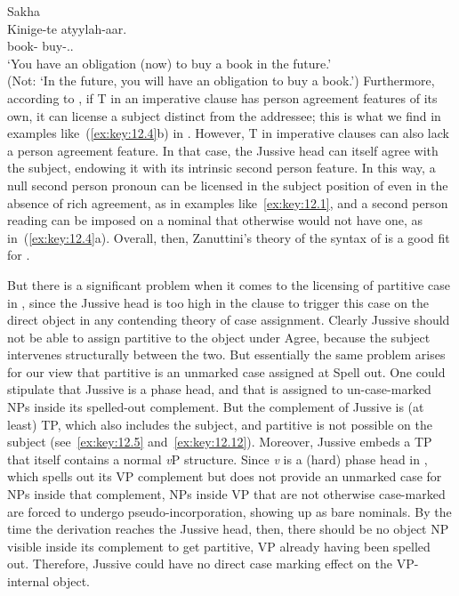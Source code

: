 \documentclass[output=paper]{langsci/langscibook}
\begin{document}
\ea\label{ex:key:12.13}Sakha\\
	\gll Kinige-te  atyylah-aar.\\
        book-\Part{}  buy-\Fut{}.\Imp{}.\Ssg{}\\
	\glt ‘You have an obligation (now) to buy a book in the future.’\\
		(Not: ‘In the future, you will have an obligation to buy a book.’)
\z
Furthermore, according to \citet{Zanuttini2008}, if T in an imperative clause
has person agreement features of its own, it can license a subject distinct
from the addressee; this is what we find in examples like~(\ref{ex:key:12.4}b) in .
However, T in imperative clauses can also lack a person agreement feature. In
that case, the Jussive head can itself agree with the subject, endowing it with
its intrinsic second person feature. In this way, a null second person pronoun
can be licensed in the subject position of  even in the absence of
rich agreement, as in examples like~\eqref{ex:key:12.1}, and a second person reading can be
imposed on a nominal that otherwise would not have one, as in~(\ref{ex:key:12.4}a). Overall,
then, Zanuttini’s theory of the syntax of  is a good fit for .

But there is a significant problem when it comes to the licensing of partitive
case in  , since the Jussive head is too high in the clause to
trigger this case on the direct object in any contending theory of case
assignment. Clearly Jussive should not be able to assign partitive to the
object under Agree, because the subject intervenes structurally between the
two. But essentially the same problem arises for our view that partitive is an
unmarked case assigned at Spell out. One could stipulate that Jussive is a
phase head, and that  is assigned to un-case-marked NPs inside
its spelled-out complement. But the complement of Jussive is (at least) TP,
which also includes the subject, and partitive is not possible on the subject
(see~\eqref{ex:key:12.5} and~\eqref{ex:key:12.12}). Moreover, Jussive embeds a TP that itself contains a normal
\emph{v}P structure. Since \emph{v} is a (hard) phase head in , which spells out its VP
complement but does not provide an unmarked case for NPs inside that
complement, NPs inside VP that are not otherwise case-marked are forced to
undergo pseudo-incorporation, showing up as bare nominals. By the time the
derivation reaches the Jussive head, then, there should be no object NP visible
inside its complement to get partitive, VP already having been spelled out.
Therefore, Jussive could have no direct case marking effect on the VP-internal
object.
\end{document}
